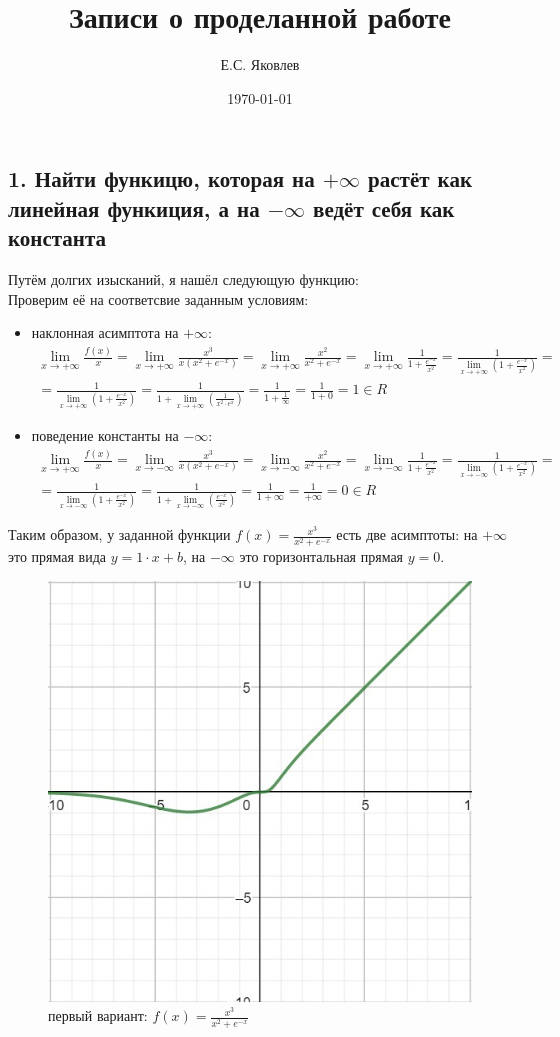 \documentclass{article}
\begin{document}
\title{Записи о проделанной работе}
\author{Е.С. Яковлев}
\date{\today}
\maketitle
	\subsection*{1. Найти функицю, которая на $+ \infty$ растёт как линейная функиция, а на $- \infty$ ведёт себя как константа}
	Путём долгих изысканий, я нашёл следующую функцию:
	\\
	Проверим её на соответсвие заданным условиям:
	\begin{itemize}
		\item 	наклонная асимптота на $+ \infty$:
		\begin{gather*}
			\lim_{x\to + \infty} \frac{f(x)}{x} = \lim_{x\to + \infty} \frac{x^3}{x(x^2 + e^{-x})}=\lim_{x\to + \infty} \frac{x^2}{x^2 + e^{-x}}=\lim_{x\to + \infty} \frac{1}{1 + \frac {e^{-x}}{x^2}}=\frac{1}{\lim_{x\to + \infty} \left( 1 + \frac {e^{-x}}{x^2}\right) } =\nonumber \\ =\frac{1}{\lim_{x\to + \infty} \left( 1 + \frac {e^{-x}}{x^2}\right) } = \frac{1}{1 + \lim_{x\to + \infty} \left(\frac {1}{x^2 \cdot e^{x}}\right) } = \frac{1}{1 + \frac{1}{\infty} } = \frac{1}{1 + 0} = 1 \in R
			\end{gather*}
				\item 	поведение константы на $- \infty$:
			\begin{gather*}
			\lim_{x\to + \infty} \frac{f(x)}{x} = \lim_{x\to - \infty} \frac{x^3}{x(x^2 + e^{-x})}=\lim_{x\to - \infty} \frac{x^2}{x^2 + e^{-x}}=\lim_{x\to - \infty} \frac{1}{1 + \frac {e^{-x}}{x^2}}=\frac{1}{\lim_{x\to - \infty} \left( 1 + \frac {e^{-x}}{x^2}\right) } =\nonumber \\ =\frac{1}{\lim_{x\to - \infty} \left( 1 + \frac {e^{-x}}{x^2}\right) } = \frac{1}{1 + \lim_{x\to - \infty}\left( \frac {e^{-x}}{x^2}\right) } = \frac{1}{1 + \infty } = \frac{1}{+\infty} = 0 \in R
			\end{gather*}
	\end{itemize}
	Таким образом, у заданной функции $f(x) = \frac{x^3}{x^2 + e^{-x}}$ есть две асимптоты: на $+\infty$ это прямая вида $y = 1 \cdot x + b$, на $-\infty$ это горизонтальная прямая $y = 0$.
	\begin{figure}[h]
		\centering
		\includegraphics[width=0.5\linewidth]{assets/plot_task_1.jpg}
		\caption{первый вариант: $f(x) = \frac{x^3}{x^2 + e^{-x}}$}
		\label{fig:mpr}
	\end{figure}
\end{document}
